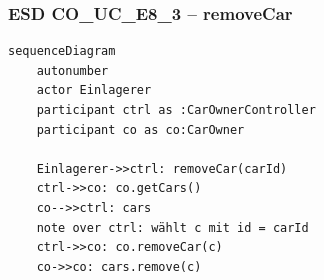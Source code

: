 \newpage

{}
\subsubsection*{ESD CO\_UC\_E8\_3 – removeCar}

\begin{lstlisting}[basicstyle=\ttfamily\small, breaklines=true]
sequenceDiagram
    autonumber
    actor Einlagerer
    participant ctrl as :CarOwnerController
    participant co as co:CarOwner

    Einlagerer->>ctrl: removeCar(carId)
    ctrl->>co: co.getCars()
    co-->>ctrl: cars
    note over ctrl: wählt c mit id = carId
    ctrl->>co: co.removeCar(c)
    co->>co: cars.remove(c)
\end{lstlisting}

\newpage
